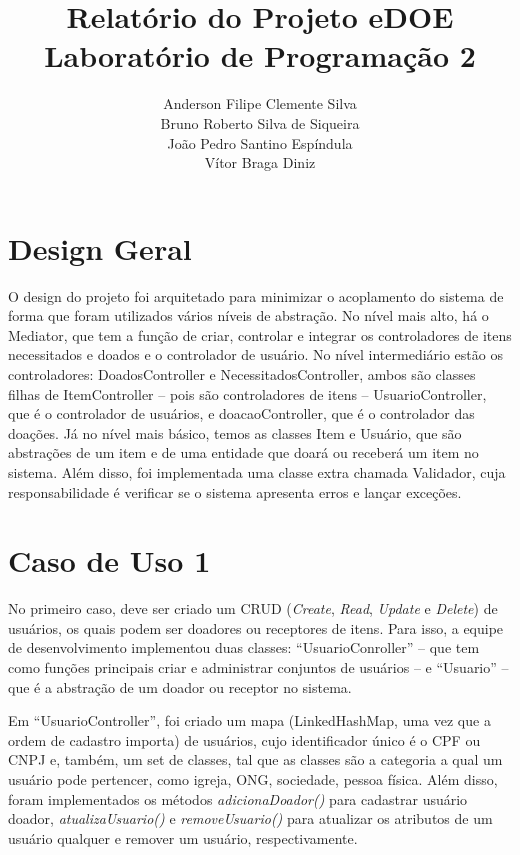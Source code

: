 \documentclass[journal,12pt,onecolumn,]{article}
\begin{document}
	
	\title{Relatório do Projeto eDOE \\ Laboratório de Programação 2}
	\author{Anderson Filipe Clemente Silva \\
			Bruno Roberto Silva de Siqueira \\
			João Pedro Santino Espíndula \\
			Vítor Braga Diniz}
	
	\maketitle
	\newpage
	
	\tableofcontents
	
	\newpage
	
	\section{Design Geral}
	O design do projeto foi arquitetado para minimizar o acoplamento do sistema de forma que foram utilizados vários níveis de abstração. No nível mais alto, há o Mediator, que tem a função de criar, controlar e integrar os controladores de itens necessitados e doados e o controlador de usuário. No nível intermediário estão os controladores: DoadosController e NecessitadosController, ambos são classes filhas de ItemController -- pois são controladores de itens -- UsuarioController, que é o controlador de usuários, e doacaoController, que é o controlador das doações. Já no nível mais básico, temos as classes Item e Usuário, que são abstrações de um item e de uma entidade que doará ou receberá um item no sistema. Além disso, foi implementada uma classe extra chamada Validador, cuja responsabilidade é verificar se o sistema apresenta erros e lançar exceções. 
	
	\section{Caso de Uso 1}
	No primeiro caso, deve ser criado um CRUD (\textit{Create}, \textit{Read}, \textit{Update} e \textit{Delete}) de usuários, os quais podem ser doadores ou receptores de itens. Para isso, a equipe de desenvolvimento implementou duas classes: “UsuarioConroller” -- que tem como funções principais criar e administrar conjuntos de usuários -- e “Usuario” -- que é a abstração de um doador ou receptor no sistema.
	
	Em “UsuarioController”,  foi criado um mapa (LinkedHashMap, uma vez que a ordem de cadastro importa) de usuários, cujo identificador único é o CPF ou CNPJ e, também, um set de classes, tal que as classes são a categoria a qual um usuário pode pertencer, como igreja, ONG, sociedade, pessoa física. Além disso, foram implementados os métodos \textit{adicionaDoador()} para cadastrar usuário doador, \textit{atualizaUsuario()} e \textit{removeUsuario()} para atualizar os atributos de um usuário qualquer e remover um usuário, respectivamente.
	
\end{document}
